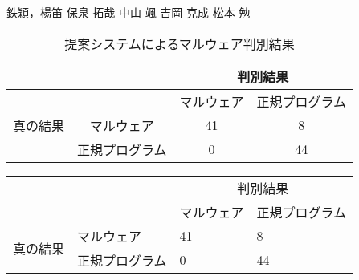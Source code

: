 
鉄穎，楊笛
保泉 拓哉
中山 颯
吉岡 克成
松本 勉

\begin{table}[h]
    \centering
    \caption{提案システムによるマルウェア判別結果}
    \label{tab:detect}
\begin{tabular}[t]{|l|c|c|c|}
    \hline
            &  &  \multicolumn{2}{c|}{判別結果}  \\ \hline 
            &  &  マルウェア & 正規プログラム \\ \hline 
       真の結果 & マルウェア & 41 & 8 \\ \hline
            & 正規プログラム & 0 & 44 \\ \hline
\end{tabular}
\end{table}






\begin{table}[]
    \begin{tabular}{ll|l|l|}
    \cline{3-4}
                                                &         & \multicolumn{2}{c|}{判別結果} \\ \cline{3-4} 
                                                &         & マルウェア      & 正規プログラム      \\ \hline
    \multicolumn{1}{|c|}{\multirow{2}{*}{真の結果}} & マルウェア   & 41         & 8            \\ \cline{2-4} 
    \multicolumn{1}{|c|}{}                      & 正規プログラム & 0          & 44           \\ \hline
    \end{tabular}
    \end{table}